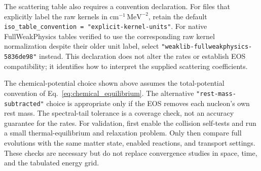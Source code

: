 \documentclass[aps,prd,reprint,nofootinbib,notitlepage]{revtex4-2}
\begin{document}
The scattering table also requires a convention declaration. For files
that explicitly label the raw kernels in
$\mathrm{cm}^{-1}\,\mathrm{MeV}^{-2}$, retain the default
\texttt{iso\_table\_convention = "explicit-kernel-units"}.
For native FullWeakPhysics tables verified to use the corresponding raw
kernel normalization despite their older unit label, select
\texttt{"weaklib-fullweakphysics-5836de98"} instead. This declaration
does not alter the rates or establish EOS compatibility; it identifies
how to interpret the supplied scattering coefficients.

The chemical-potential choice shown above assumes the total-potential
convention of Eq.~\eqref{eq:chemical_equilibrium}. The alternative
\texttt{"rest-mass-subtracted"} choice is appropriate only if the EOS
removes each nucleon's own rest mass. The spectral-tail
tolerance is a coverage check, not an accuracy guarantee for the rates.
For validation, first enable the collision self-tests and run a small
thermal-equilibrium and relaxation problem. Only then compare full
evolutions with the same matter state, enabled reactions, and transport
settings. These checks are necessary but do not replace convergence
studies in space, time, and the tabulated energy grid.
\end{document}
